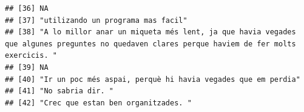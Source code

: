 \documentclass[
]{article}
\begin{document}
\begin{verbatim}
## [36] NA                                                                                                                                                                                                                                                                                                                                                                                                   
## [37] "utilizando un programa mas facil"                                                                                                                                                                                                                                                                                                                                                                   
## [38] "A lo millor anar un miqueta més lent, ja que havia vegades que algunes preguntes no quedaven clares perque haviem de fer molts exercicis. "                                                                                                                                                                                                                                                         
## [39] NA                                                                                                                                                                                                                                                                                                                                                                                                   
## [40] "Ir un poc més aspai, perquè hi havia vegades que em perdia"                                                                                                                                                                                                                                                                                                                                         
## [41] "No sabria dir. "                                                                                                                                                                                                                                                                                                                                                                                    
## [42] "Crec que estan ben organitzades. "                                                                                                                                                                                                                                                                                                                                                                  

\end{verbatim}
\end{document}
